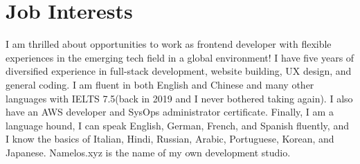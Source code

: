 \section{Job Interests}
I am thrilled about opportunities to work as frontend developer with flexible experiences in the emerging tech field in a global environment! I have five years of diversified experience in full-stack development, website building, UX design, and general coding. I am fluent in both English and Chinese and many other languages with IELTS 7.5(back in 2019 and I never bothered taking again). I also have an AWS developer and SysOps administrator certificate. Finally, I am a language hound, I can speak English, German, French, and Spanish fluently, and I know the basics of Italian, Hindi, Russian, Arabic, Portuguese, Korean, and Japanese. Namelos.xyz is the name of my own development studio.